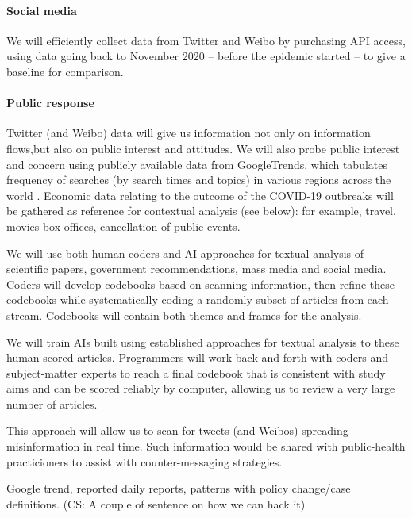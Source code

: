 \paragraph{Social media} 
We will efficiently collect data from Twitter and Weibo by purchasing API access, using data going back to November 2020 -- before the epidemic started -- to give a baseline for comparison. 

\paragraph{Public response}
Twitter (and Weibo) data will give us information not only on information flows,but also on public interest and attitudes. We will also probe public interest and concern using publicly available data from GoogleTrends, which tabulates frequency of searches (by search times and topics) in various regions across the world \cite{BousAgac17, MahrBrag19}.
Economic data relating to the outcome of the COVID-19 outbreaks will be gathered as reference for contextual analysis (see below): for example, travel, movies box offices, cancellation of public events.



We will use both human coders and AI approaches for textual analysis of scientific papers, government recommendations, mass media and social media. Coders will develop codebooks based on scanning information, then refine these codebooks while systematically coding a randomly subset of articles from each stream. Codebooks will contain both themes and frames for the analysis.

We will train AIs built using established approaches for textual analysis to these human-scored articles. Programmers will work back and forth with coders and subject-matter experts to reach a final codebook that is consistent with study aims and can be scored reliably by computer, allowing us to review a very large number of articles. 

This approach will allow us to scan for tweets (and Weibos) spreading misinformation in real time. Such information would be shared with public-health practicioners to assist with counter-messaging strategies.


Google trend, reported daily reports, patterns with policy change/case definitions. (CS: A couple of sentence on how we can hack it)

